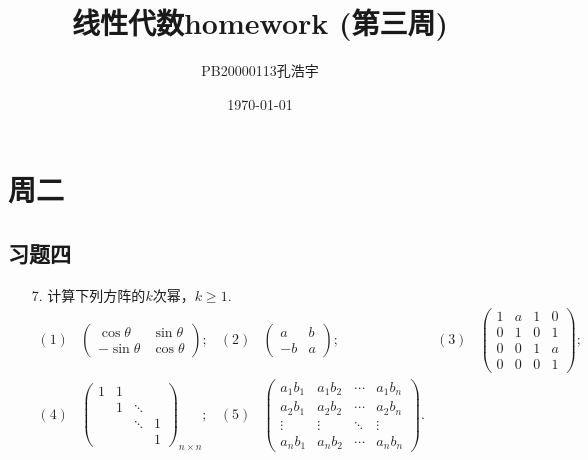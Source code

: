 \documentclass{article}
\title{线性代数homework (第三周)}
\author{PB20000113孔浩宇}
\date{\today}
\begin{document}
\maketitle
\section{周二}                             %
    \subsection{习题四}                      %
    \begin{enumerate}
        \item [7.]计算下列方阵的$k$次幂，$k\geqslant 1$.
        \begin{align*}
            (1)&
            \begin{pmatrix}
               \cos\theta &  \sin\theta\\
               -\sin\theta  & \cos\theta
            \end{pmatrix};
            &(2)&
            \begin{pmatrix}
                a & b\\
                -b & a
            \end{pmatrix};
            &(3)&
            \begin{pmatrix}
                1& a& 1& 0\\
                0& 1& 0& 1\\
                0& 0& 1& a\\
                0& 0& 0& 1
            \end{pmatrix};\\
            (4)&
            {\begin{pmatrix}
                1& 1& \ & \ \\
                \ & 1 & \ddots& \ \\
                \ & \ & \ddots & 1\\
                \ & \ & \ & 1
            \end{pmatrix}}_{n\times n};
            &(5)&
            \begin{pmatrix}
                a_{1}b_{1}& a_{1}b_{2}& \cdots &a_{1}b_{n}\\
                a_{2}b_{1}& a_{2}b_{2}& \cdots &a_{2}b_{n}\\
                \vdots & \vdots &\ddots &\vdots\\
                a_{n}b_{1}& a_{n}b_{2}& \cdots &a_{n}b_{n}
            \end{pmatrix}.
            &\ &
        \end{align*}


\end{enumerate}
\end{document}
